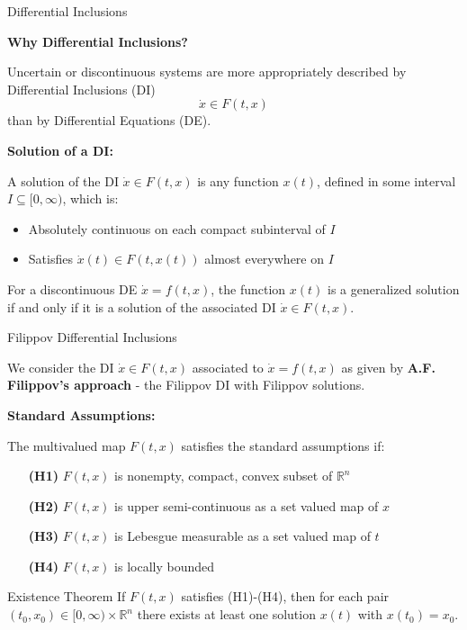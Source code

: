 \begin{frame}{Differential Inclusions}

	\textbf{Why Differential Inclusions?}

	Uncertain or discontinuous systems are more appropriately described by Differential Inclusions (DI)
	$$\dot{x} \in F(t,x)$$
	than by Differential Equations (DE).

	\vspace{0.5cm}
	\textbf{Solution of a DI:}

	A solution of the DI $\dot{x} \in F(t,x)$ is any function $x(t)$, defined in some interval $I \subseteq [0,\infty)$, which is:
	\begin{itemize}
		\item Absolutely continuous on each compact subinterval of $I$
		\item Satisfies $\dot{x}(t) \in F(t,x(t))$ almost everywhere on $I$
	\end{itemize}

	For a discontinuous DE $\dot{x} = f(t,x)$, the function $x(t)$ is a \alert{generalized solution} if and only if it is a solution of the associated DI $\dot{x} \in F(t,x)$.

\end{frame}

\begin{frame}{Filippov Differential Inclusions}

	We consider the DI $\dot{x} \in F(t,x)$ associated to $\dot{x} = f(t,x)$ as given by \textbf{A.F. Filippov's approach} - the \alert{Filippov DI} with \alert{Filippov solutions}. \cite{Filippov1988}

	\vspace{0.5cm}
	\textbf{Standard Assumptions:}

	The multivalued map $F(t,x)$ satisfies the standard assumptions if:

	\begin{itemize}
		\item[\textbf{(H1)}] $F(t,x)$ is nonempty, compact, convex subset of $\mathbb{R}^n$
		\item[\textbf{(H2)}] $F(t,x)$ is upper semi-continuous as a set valued map of $x$
		\item[\textbf{(H3)}] $F(t,x)$ is Lebesgue measurable as a set valued map of $t$
		\item[\textbf{(H4)}] $F(t,x)$ is locally bounded
	\end{itemize}

	\vspace{0.3cm}

    \begin{block}{Existence Theorem}
        If $F(t,x)$ satisfies (H1)-(H4), then for each pair $(t_0,x_0) \in [0,\infty) \times \mathbb{R}^n$ there exists at least one solution $x(t)$ with $x(t_0) = x_0$.
    \end{block}

\end{frame}

